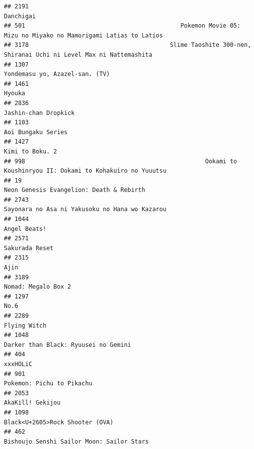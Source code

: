 \documentclass[
]{article}
\begin{document}
\begin{verbatim}
## 2191                                                                                                 Danchigai
## 501                                            Pokemon Movie 05: Mizu no Miyako no Mamorigami Latias to Latios
## 3178                                        Slime Taoshite 300-nen, Shiranai Uchi ni Level Max ni Nattemashita
## 1307                                                                            Yondemasu yo, Azazel-san. (TV)
## 1461                                                                                                    Hyouka
## 2836                                                                                      Jashin-chan Dropkick
## 1103                                                                                        Aoi Bungaku Series
## 1427                                                                                           Kimi to Boku. 2
## 998                                                   Ookami to Koushinryou II: Ookami to Kohakuiro no Yuuutsu
## 19                                                                    Neon Genesis Evangelion: Death & Rebirth
## 2743                                                            Sayonara no Asa ni Yakusoku no Hana wo Kazarou
## 1044                                                                                              Angel Beats!
## 2571                                                                                            Sakurada Reset
## 2315                                                                                                      Ajin
## 3189                                                                                       Nomad: Megalo Box 2
## 1297                                                                                                      No.6
## 2289                                                                                              Flying Witch
## 1048                                                                      Darker than Black: Ryuusei no Gemini
## 404                                                                                                   xxxHOLiC
## 901                                                                                  Pokemon: Pichu to Pikachu
## 2053                                                                                          AkaKill! Gekijou
## 1098                                                                           Black<U+2605>Rock Shooter (OVA)
## 462                                                                  Bishoujo Senshi Sailor Moon: Sailor Stars

\end{verbatim}
\end{document}
